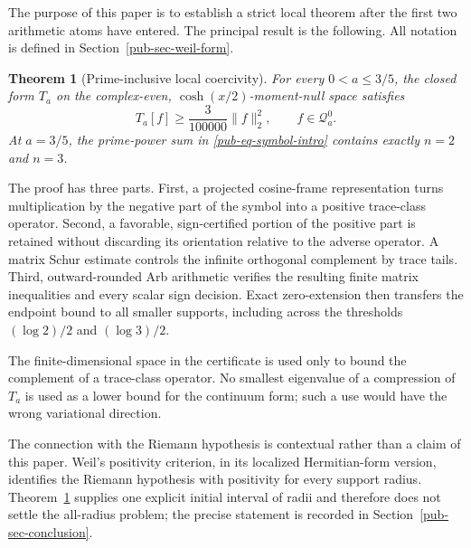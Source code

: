 \documentclass[11pt]{article}
\newtheorem{theorem}{Theorem}[section]
\theoremstyle{remark}
\begin{document}
The purpose of this paper is to establish a strict local theorem after the first two arithmetic atoms have entered.
The principal result is the following.
All notation is defined in Section~\ref{pub-sec-weil-form}.

\begin{theorem}[Prime-inclusive local coercivity]
\label{pub-thm-main}
For every \(0<a\leq3/5\), the closed form \(T_a\) on the complex-even,
\(\cosh(x/2)\)-moment-null space satisfies
\begin{equation}
       T_a[f]\geq\frac{3}{100000}\lVert f\rVert_2^2,
       \qquad f\in\mathcal Q_a^0.
\label{pub-eq-main-bound}
\end{equation}
At \(a=3/5\), the prime-power sum in \eqref{pub-eq-symbol-intro} contains exactly \(n=2\) and \(n=3\).
\end{theorem}

The proof has three parts.
First, a projected cosine-frame representation turns multiplication by the negative part of the symbol into a positive trace-class operator.
Second, a favorable, sign-certified portion of the positive part is retained without discarding its orientation relative to the adverse operator.
A matrix Schur estimate controls the infinite orthogonal complement by trace tails.
Third, outward-rounded Arb arithmetic verifies the resulting finite matrix inequalities and every scalar sign decision.
Exact zero-extension then transfers the endpoint bound to all smaller supports,
including across the thresholds \((\log2)/2\) and \((\log3)/2\).

The finite-dimensional space in the certificate is used only to bound the complement of a trace-class operator.
No smallest eigenvalue of a compression of \(T_a\) is used as a lower bound for the continuum form;
such a use would have the wrong variational direction.

The connection with the Riemann hypothesis is contextual rather than a claim of this paper.
Weil's positivity criterion, in its localized Hermitian-form version,
identifies the Riemann hypothesis with positivity for every support radius.
Theorem~\ref{pub-thm-main} supplies one explicit initial interval of radii and therefore does not settle the all-radius problem;
the precise statement is recorded in Section~\ref{pub-sec-conclusion}.
\end{document}
